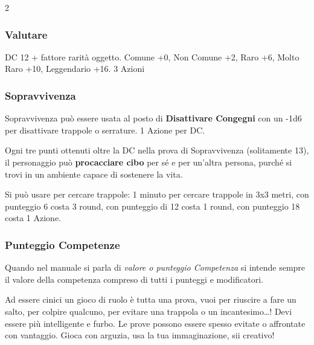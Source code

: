\begin{multicols}{2}
\titlespacing*{\subsubsection}{0pt}{0.5em}{0.5em}\subsubsection*{Valutare}\label{compvalutare}
DC 12 + fattore rarità oggetto. Comune +0, Non Comune +2, Raro +6, Molto Raro +10, Leggendario +16. 3 Azioni

\titlespacing*{\subsubsection}{0pt}{0.5em}{0.5em}\subsubsection*{Sopravvivenza}\label{sopravvivenza}

Sopravvivenza può essere usata al posto di \textbf{Disattivare Congegni} con un -1d6 per disattivare trappole o serrature. 1 Azione per DC.

Ogni tre punti ottenuti oltre la DC nella prova di Sopravvivenza (solitamente 13), il personaggio può \textbf{procacciare cibo} per sé e per un'altra persona, purché si trovi in un ambiente capace di sostenere la vita.

Si può usare per cercare trappole: 1 minuto per cercare trappole in 3x3 metri, con punteggio 6 costa 3 round, con punteggio di 12 costa 1 round, con punteggio 18 costa 1 Azione.

\subsubsection*{Punteggio Competenze}\label{Punteggio Competenze}

Quando nel manuale si parla di \emph{valore o punteggio Competenza} si intende sempre il valore della competenza compreso di tutti i punteggi e modificatori.

\begin{giocatore}
	Ad essere cinici un gioco di ruolo è tutta una prova, vuoi per riuscire a fare un salto, per colpire qualcuno, per evitare una trappola o un incantesimo…!
	Devi essere più intelligente e furbo. Le prove possono essere spesso evitate o affrontate con vantaggio. Gioca con arguzia, usa la tua immaginazione, sii creativo!
\end{giocatore}



\end{multicols}

